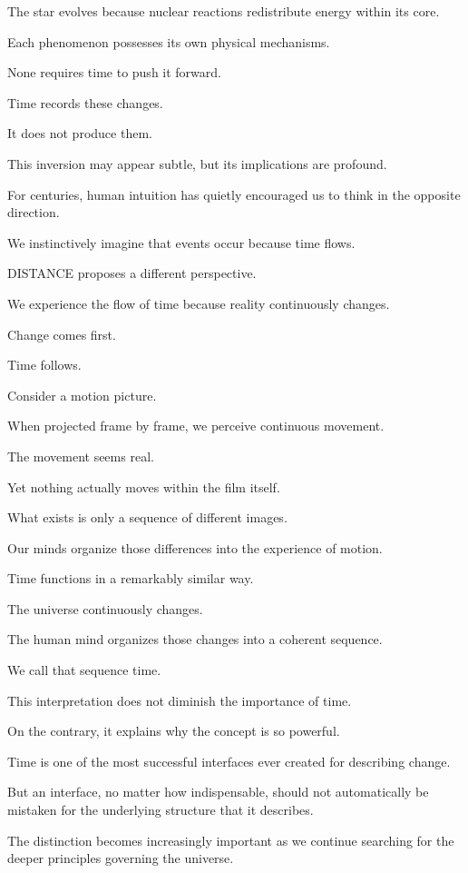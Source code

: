 The star evolves because nuclear reactions redistribute energy within its core.

Each phenomenon possesses its own physical mechanisms.

None requires time to push it forward.

Time records these changes.

It does not produce them.

This inversion may appear subtle, but its implications are profound.

For centuries, human intuition has quietly encouraged us to think in the opposite direction.

We instinctively imagine that events occur because time flows.

DISTANCE proposes a different perspective.

We experience the flow of time because reality continuously changes.

Change comes first.

Time follows.

Consider a motion picture.

When projected frame by frame, we perceive continuous movement.

The movement seems real.

Yet nothing actually moves within the film itself.

What exists is only a sequence of different images.

Our minds organize those differences into the experience of motion.

Time functions in a remarkably similar way.

The universe continuously changes.

The human mind organizes those changes into a coherent sequence.

We call that sequence time.

This interpretation does not diminish the importance of time.

On the contrary, it explains why the concept is so powerful.

Time is one of the most successful interfaces ever created for describing change.

But an interface, no matter how indispensable, should not automatically be mistaken for the underlying structure that it describes.

The distinction becomes increasingly important as we continue searching for the deeper principles governing the universe.

